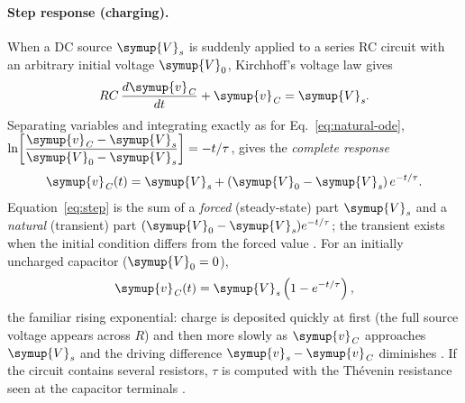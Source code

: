 \documentclass[12pt,a4paper]{article}
\begin{document}
	\paragraph{Step response (charging).}
	When a DC source $\symup{V}_{\mathit{s}}$ is suddenly applied to a series RC circuit
	with an arbitrary initial voltage $\symup{V}_{0}$, Kirchhoff's voltage law gives
	\begin{equation}
		RC\,\frac{d\symup{v}_{\mathit{C}}}{dt} + \symup{v}_{\mathit{C}} = \symup{V}_{\mathit{s}} .
		\label{eq:step-ode}
	\end{equation}
	Separating variables and integrating exactly as for
	Eq.~\eqref{eq:natural-ode},
	$\ln\!\left[\dfrac{\symup{v}_{\mathit{C}} - \symup{V}_{\mathit{s}}}{\symup{V}_{0} - \symup{V}_{\mathit{s}}}\right] = -t/\tau$, gives the
	\emph{complete response}
	\begin{equation}
		\symup{v}_{\mathit{C}}(t) = \symup{V}_{\mathit{s}} + (\symup{V}_{0} - \symup{V}_{\mathit{s}})\, e^{-t/\tau}.
		\label{eq:step}
	\end{equation}
	Equation~\eqref{eq:step} is the sum of a \emph{forced}
	(steady-state) part $\symup{V}_{\mathit{s}}$ and a \emph{natural} (transient) part
	$(\symup{V}_{0} - \symup{V}_{\mathit{s}})e^{-t/\tau}$; the transient exists when the
	initial condition differs from the forced value \cite{sadiku}.  For an
	initially uncharged capacitor ($\symup{V}_{0} = 0$),
	\begin{equation}
		\symup{v}_{\mathit{C}}(t) = \symup{V}_{\mathit{s}}\left(1 - e^{-t/\tau}\right),
		\label{eq:charging}
	\end{equation}
	the familiar rising exponential: charge is deposited quickly at
	first (the full source voltage appears across $R$) and then more
	slowly as $\symup{v}_{\mathit{C}}$ approaches $\symup{V}_{\mathit{s}}$ and the driving difference
	$\symup{v}_{\mathit{s}} - \symup{v}_{\mathit{C}}$ diminishes \cite{boylestad}.  If the circuit contains
	several resistors, $\tau$ is computed with the Th\'evenin resistance
	seen at the capacitor terminals \cite{sadiku}.
	
\end{document}
